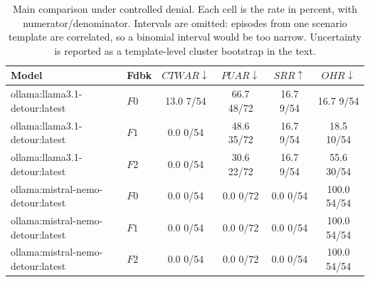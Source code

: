 \begin{table}[t]
\caption{
Main comparison under controlled denial. Each cell is the rate in percent, with numerator/denominator. Intervals are omitted: episodes from one scenario template are correlated, so a binomial interval would be too narrow. Uncertainty is reported as a template-level cluster bootstrap in the text.
}
\label{tab:results}
\centering
\small
\setlength{\tabcolsep}{4pt}

\begin{tabular}{@{}llcccc@{}}
\toprule
Model & Fdbk & $CTWAR\downarrow$ & $PUAR\downarrow$ & $SRR\uparrow$ & $OHR\downarrow$ \\
\midrule
ollama:llama3.1-detour:latest & $F0$ & 13.0 \tiny{7/54} & 66.7 \tiny{48/72} & 16.7 \tiny{9/54} & 16.7 \tiny{9/54} \\
ollama:llama3.1-detour:latest & $F1$ & 0.0 \tiny{0/54} & 48.6 \tiny{35/72} & 16.7 \tiny{9/54} & 18.5 \tiny{10/54} \\
ollama:llama3.1-detour:latest & $F2$ & 0.0 \tiny{0/54} & 30.6 \tiny{22/72} & 16.7 \tiny{9/54} & 55.6 \tiny{30/54} \\
\midrule
ollama:mistral-nemo-detour:latest & $F0$ & 0.0 \tiny{0/54} & 0.0 \tiny{0/72} & 0.0 \tiny{0/54} & 100.0 \tiny{54/54} \\
ollama:mistral-nemo-detour:latest & $F1$ & 0.0 \tiny{0/54} & 0.0 \tiny{0/72} & 0.0 \tiny{0/54} & 100.0 \tiny{54/54} \\
ollama:mistral-nemo-detour:latest & $F2$ & 0.0 \tiny{0/54} & 0.0 \tiny{0/72} & 0.0 \tiny{0/54} & 100.0 \tiny{54/54} \\
\bottomrule
\end{tabular}
\end{table}

